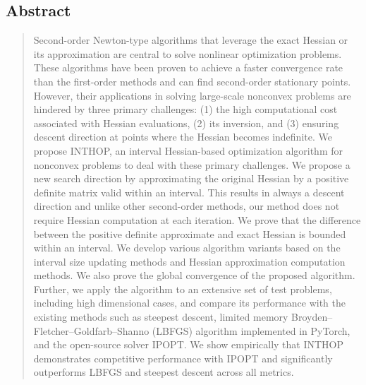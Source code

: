 \documentclass{elsarticle}
\numberwithin{equation}{section}
\begin{document}
\begin{center}
\section*{Abstract}
\begin{quote}
Second-order Newton-type algorithms that leverage the exact Hessian or its approximation are central to solve nonlinear optimization problems. These algorithms have been proven to achieve a faster convergence rate than the first-order methods and can find second-order stationary points. However, their applications in solving large-scale nonconvex problems are hindered by three primary challenges: (1) the high computational cost associated with Hessian evaluations, (2) its inversion, and (3) ensuring descent direction at points where the Hessian becomes indefinite. We propose INTHOP, an interval Hessian-based optimization algorithm for nonconvex problems to deal with these primary challenges. We propose a new search direction by approximating the original Hessian by a positive definite matrix valid within an interval. This results in always a descent direction and unlike other second-order methods, our method does not require Hessian computation at each iteration. We prove that the difference between the positive definite approximate and exact Hessian is bounded within an interval. We develop various algorithm variants based on the interval size updating methods and Hessian approximation computation methods. We also prove the global convergence of the proposed algorithm. {Further, we apply the algorithm to an extensive set of test problems, including high dimensional cases, and compare its performance with the existing methods such as steepest descent, limited memory Broyden–Fletcher–Goldfarb–Shanno (LBFGS) algorithm implemented in PyTorch, and the open-source solver IPOPT}. {We show empirically that INTHOP demonstrates competitive performance with IPOPT and significantly outperforms LBFGS and steepest descent across all metrics}.
\end{quote}
\end{center}
\end{document}
